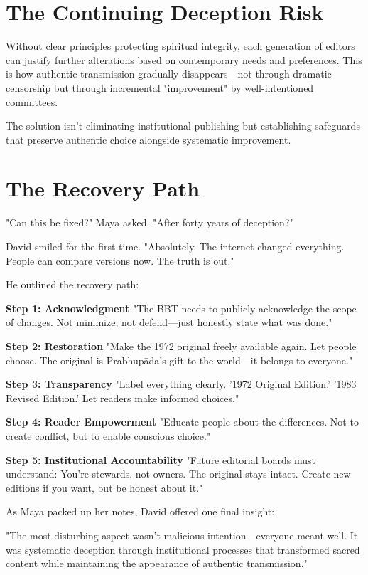 \documentclass[11pt,twoside]{book}
\begin{document}
\section*{The Continuing Deception Risk}
\label{sec:org1e5dd94}

Without clear principles protecting spiritual integrity, each generation of editors can justify further alterations based on contemporary needs and preferences. This is how authentic transmission gradually disappears—not through dramatic censorship but through incremental "improvement" by well-intentioned committees.

The solution isn't eliminating institutional publishing but establishing safeguards that preserve authentic choice alongside systematic improvement.
\section*{The Recovery Path}
\label{sec:orge63ee7b}

"Can this be fixed?" Maya asked. "After forty years of deception?"

David smiled for the first time. "Absolutely. The internet changed everything. People can compare versions now. The truth is out."

He outlined the recovery path:

\textbf{\textbf{Step 1: Acknowledgment}}
"The BBT needs to publicly acknowledge the scope of changes. Not minimize, not defend—just honestly state what was done."

\textbf{\textbf{Step 2: Restoration}}
"Make the 1972 original freely available again. Let people choose. The original is Prabhupāda's gift to the world—it belongs to everyone."

\textbf{\textbf{Step 3: Transparency}}
"Label everything clearly. '1972 Original Edition.' '1983 Revised Edition.' Let readers make informed choices."

\textbf{\textbf{Step 4: Reader Empowerment}}
"Educate people about the differences. Not to create conflict, but to enable conscious choice."

\textbf{\textbf{Step 5: Institutional Accountability}}
"Future editorial boards must understand: You're stewards, not owners. The original stays intact. Create new editions if you want, but be honest about it."

As Maya packed up her notes, David offered one final insight:

"The most disturbing aspect wasn't malicious intention—everyone meant well. It was systematic deception through institutional processes that transformed sacred content while maintaining the appearance of authentic transmission."
\end{document}

